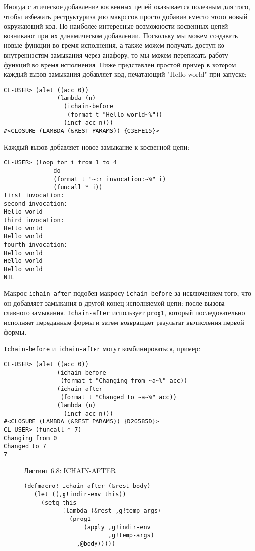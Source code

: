 Иногда статическое добавление косвенных цепей оказывается полезным для того, чтобы избежать реструктуризацию макросов просто добавив вместо этого новый окружающий код. Но наиболее интересные возможности косвенных цепей возникают при их динамическом добавлении. Поскольку мы можем создавать новые функции во время исполнения, а также можем получать доступ ко внутренностям замыкания через анафору, то мы можем переписать работу функций во время исполнения. Ниже представлен простой пример в котором каждый вызов замыкания добавляет код, печатающий "Hello world" при запуске:

\begin{verbatim}
CL-USER> (alet ((acc 0))
               (lambda (n)
                 (ichain-before
                  (format t "Hello world~%"))
                 (incf acc n)))
#<CLOSURE (LAMBDA (&REST PARAMS)) {C3EFE15}>
\end{verbatim}

Каждый вызов добавляет новое замыкание к косвенной цепи:

\begin{verbatim}
CL-USER> (loop for i from 1 to 4
              do
              (format t "~:r invocation:~%" i)
              (funcall * i))
first invocation:
second invocation:
Hello world
third invocation:
Hello world
Hello world
fourth invocation:
Hello world
Hello world
Hello world
NIL
\end{verbatim}

Макрос \verb"ichain-after" подобен макросу \verb"ichain-before" за исключением того, что он добавляет замыкания в другой конец исполняемой цепи: после вызова главного замыкания. \verb"Ichain-after" использует \verb"prog1", который последовательно исполняет переданные формы и затем возвращает результат вычисления первой формы.

\verb"Ichain-before" и \verb"ichain-after" могут комбинироваться, пример:

\begin{verbatim}
CL-USER> (alet ((acc 0))
               (ichain-before
                (format t "Changing from ~a~%" acc))
               (ichain-after
                (format t "Changed to ~a~%" acc))
               (lambda (n)
                 (incf acc n)))
#<CLOSURE (LAMBDA (&REST PARAMS)) {D26585D}>
CL-USER> (funcall * 7)
Changing from 0
Changed to 7
7
\end{verbatim}

\begin{figure}Листинг 6.8: ICHAIN-AFTER\label{listing_6.8}
\listbegin
\begin{verbatim}
(defmacro! ichain-after (&rest body)
  `(let ((,g!indir-env this))
     (setq this
           (lambda (&rest ,g!temp-args)
             (prog1
                 (apply ,g!indir-env
                        ,g!temp-args)
               ,@body)))))
\end{verbatim}
\listend
\end{figure}

